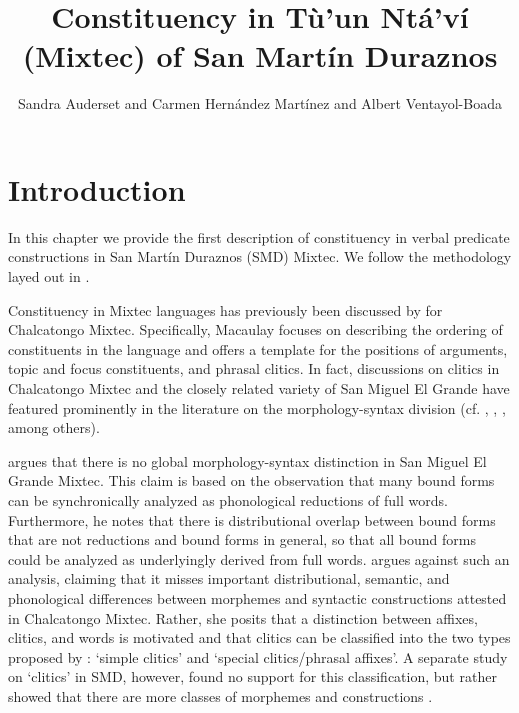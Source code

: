 \documentclass[output=paper]{langscibook}
\author{Sandra Auderset\affiliation{University of Bern} and Carmen Hernández Martínez\affiliation{University of California, Santa Barbara} and Albert Ventayol-Boada\affiliation{University of California, Santa Barbara} }
\title{Constituency in Tù'un Ntá'ví (Mixtec) of San Martín Duraznos}
\begin{document}
\maketitle




\section{Introduction} %
\label{sec:introductionn}

In this chapter we provide the first description of constituency in verbal predicate constructions in San Martín Duraznos (SMD) Mixtec. 
We follow the methodology layed out in \citet{tallman2020beyond,Tallman2021}.

Constituency in Mixtec languages has previously been discussed by 
\citet{macaulay1993argument,macaulay1996grammar} for Chalcatongo Mixtec. Specifically, Macaulay focuses on describing the ordering of constituents in the language and offers a template for the positions of arguments, topic and focus constituents, and phrasal clitics. In fact, discussions on clitics in Chalcatongo Mixtec and the closely related variety of San Miguel El Grande have featured prominently in the literature on the morphology-syntax division (cf. \citealt{pike1944analysis}, \citealt{pike1945problem}, \citealt{macaulay1987cliticization}, among others).

\citet{pike1945problem} argues that there is no global morphology-syntax distinction in San Miguel El Grande Mixtec. This claim is based on the observation that many bound forms can be synchronically analyzed as phonological reductions of full words. 
Furthermore, he notes that there is distributional overlap between bound forms that are not reductions and bound forms in general, so that all bound forms could be analyzed as underlyingly derived from full words. 
\citet{macaulay1987cliticization} argues against such an analysis, claiming that it misses important distributional, semantic, and phonological differences between morphemes and syntactic constructions attested in Chalcatongo Mixtec. 
Rather, she posits that a distinction between affixes, clitics, and words is motivated and that clitics can be classified into the two types proposed by \citet{zwicky1977on-clitics}: ‘simple clitics’ and ‘special clitics/phrasal affixes’. 
A separate study on `clitics' in SMD, however, found no support for this classification, but rather showed that there are more classes of morphemes and constructions \citep{auderset2021revisiting}.
\end{document}
